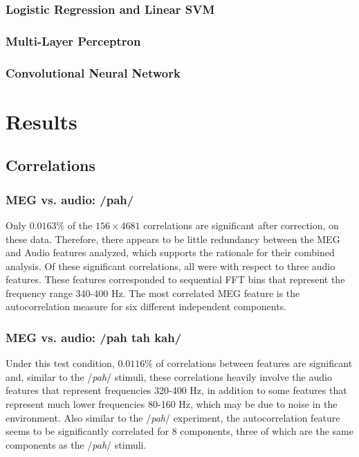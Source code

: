 \documentclass[utf8]{frontiersSCNS} %
\begin{document}
\subsubsection{Logistic Regression and Linear SVM}

\subsubsection{Multi-Layer Perceptron}

\subsubsection{Convolutional Neural Network}

\section{Results}

\subsection{Correlations}

\subsubsection{MEG vs. audio: /pah/}

Only $0.0163$\% of the $156 \times 4681$ correlations are significant after correction, on these data. Therefore, there appears to be little redundancy between the MEG and Audio features analyzed, which supports the rationale for their combined analysis. Of these significant correlations, all were with respect to three audio features. These features corresponded to sequential FFT bins that represent the frequency range 340-400 Hz. The most correlated MEG feature is the autocorrelation measure for six different independent components.

\subsubsection{MEG vs. audio: /pah tah kah/}

Under this test condition, $0.0116$\% of correlations between features are significant and, similar to the /{\em pah}/ stimuli, these correlations heavily involve the audio features that represent frequencies 320-400 Hz, in addition to some features that represent much lower frequencies 80-160 Hz, which may be due to noise in the environment. Also similar to the /{\em pah}/ experiment, the autocorrelation feature seems to be significantly correlated for 8 components, three of which are the same components as the /{\em pah}/ stimuli.
\end{document}
